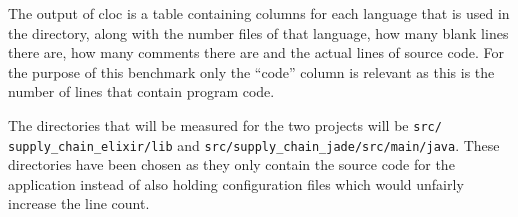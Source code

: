 The output of cloc is a table containing columns for each language that is used in the directory, along with the number files of that language, how many blank lines there are, how many comments there are and the actual lines of source code.
For the purpose of this benchmark only the ``code'' column is relevant as this is the number of lines that contain program code.

The directories that will be measured for the two projects will be \verb|src/|\\ \verb|supply_chain_elixir/lib| and \verb|src/supply_chain_jade/src/main/java|.
These directories have been chosen as they only contain the source code for the application instead of also holding configuration files which would unfairly increase the line count.
